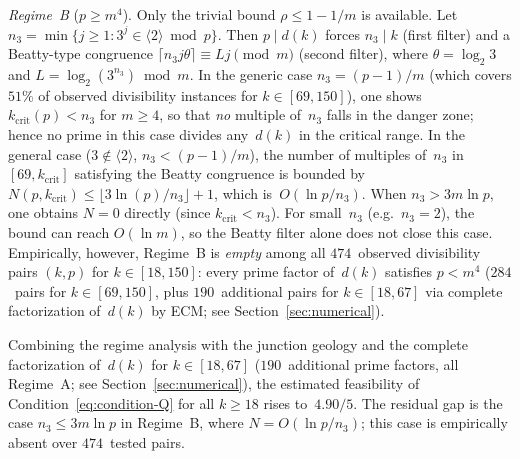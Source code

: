 \documentclass[12pt, a4paper]{amsart}
\theoremstyle{plain}
\theoremstyle{definition}
\theoremstyle{remark}
\begin{document}
\emph{Regime~B} ($p \geq m^4$).
Only the trivial bound $\rho \leq 1 - 1/m$ is available.
Let $n_3 = \min\{j \geq 1 : 3^j \in \langle 2 \rangle
\bmod p\}$. Then $p \mid d(k)$ forces $n_3 \mid k$
(first filter) and a Beatty-type congruence
$\lceil n_3 j \theta \rceil \equiv Lj \pmod{m}$ (second
filter), where $\theta = \log_2 3$ and
$L = \log_2(3^{n_3}) \bmod m$.
In the generic case $n_3 = (p-1)/m$ (which covers $51\%$ of
observed divisibility instances for $k \in [69, 150]$), one
shows $k_{\mathrm{crit}}(p) < n_3$ for $m \geq 4$, so that
\emph{no} multiple of~$n_3$ falls in the danger zone; hence
no prime in this case divides any~$d(k)$ in the critical
range.
In the general case ($3 \notin \langle 2 \rangle$,
$n_3 < (p-1)/m$), the number of multiples of~$n_3$ in
$[69, k_{\mathrm{crit}}]$ satisfying the Beatty congruence
is bounded by
$N(p, k_{\mathrm{crit}})
  \leq \lfloor 3 \ln(p) / n_3 \rfloor + 1$,
which is~$O(\ln p / n_3)$.
When $n_3 > 3m \ln p$, one obtains $N = 0$ directly
(since $k_{\mathrm{crit}} < n_3$).
For small~$n_3$ (e.g.\ $n_3 = 2$), the bound can reach
$O(\ln m)$, so the Beatty filter alone does not close this
case.
Empirically, however, Regime~B is \emph{empty} among all
$474$~observed divisibility pairs $(k, p)$ for
$k \in [18, 150]$: every prime factor of~$d(k)$ satisfies
$p < m^4$ ($284$~pairs for $k \in [69, 150]$, plus
$190$~additional pairs for $k \in [18, 67]$ via complete
factorization of~$d(k)$ by ECM;
see Section~\ref{sec:numerical}).

Combining the regime analysis with the junction geology and
the complete factorization of~$d(k)$ for $k \in [18, 67]$
($190$~additional prime factors, all Regime~A;
see Section~\ref{sec:numerical}),
the estimated feasibility of
Condition~\eqref{eq:condition-Q} for all $k \geq 18$
rises to~$4.90/5$.
The residual gap is the case $n_3 \leq 3m\ln p$ in
Regime~B, where $N = O(\ln p / n_3)$;
this case is empirically absent over $474$~tested pairs.
\end{document}
